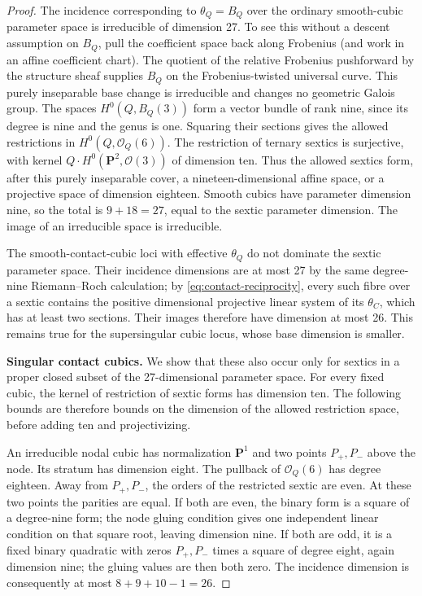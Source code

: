 \begin{proof}
The incidence corresponding to $\theta_Q=B_Q$ over the ordinary
smooth-cubic parameter space is irreducible of dimension 27.
To see this without a descent assumption on $B_Q$, pull the
coefficient space back along Frobenius (and work in an affine
coefficient chart).  The quotient of the relative Frobenius pushforward
by the structure sheaf supplies $B_Q$ on the Frobenius-twisted universal
curve.  This purely inseparable base change is irreducible and changes
no geometric Galois group.  The spaces
$H^0(Q,B_Q(3))$ form a vector bundle of rank nine, since its degree is
nine and the genus is one.  Squaring their sections gives the allowed
restrictions in $H^0(Q,\mathcal O_Q(6))$.
The restriction of ternary sextics is surjective, with kernel
$Q\cdot H^0(\mathbf P^2,\mathcal O(3))$ of dimension ten.
Thus the allowed sextics form, after this purely inseparable cover,
a nineteen-dimensional affine space, or a projective space of
dimension eighteen.  Smooth cubics have parameter dimension nine,
so the total is $9+18=27$, equal to the sextic parameter dimension.
The image of an irreducible space is irreducible.

The smooth-contact-cubic loci with effective $\theta_Q$ do not
dominate the sextic parameter space.  Their incidence dimensions are
at most 27 by the same degree-nine Riemann--Roch calculation; by
\eqref{eq:contact-reciprocity}, every such fibre over a sextic contains
the positive dimensional projective linear system of its
$\theta_C$, which has at least two sections.  Their images therefore
have dimension at most 26.  This remains true for the supersingular
cubic locus, whose base dimension is smaller.

\par\smallskip\noindent\textbf{Singular contact cubics.}
We show that these also occur only for sextics in a proper closed
subset of the 27-dimensional parameter space.
For every fixed cubic, the kernel of restriction of sextic forms has
dimension ten.  The following bounds are therefore bounds on the
dimension of the allowed restriction space, before adding ten and
projectivizing.

An irreducible nodal cubic has normalization $\mathbf P^1$ and two
points $P_+,P_-$ above the node.  Its stratum has dimension eight.
The pullback of $\mathcal O_Q(6)$ has degree eighteen.
Away from $P_+,P_-$, the orders of the restricted sextic are even.
At these two points the parities are equal.  If both are even, the
binary form is a square of a degree-nine form; the node gluing
condition gives one independent linear condition on that square root,
leaving dimension nine.  If both are odd, it is a fixed binary
quadratic with zeros $P_+,P_-$ times a square of degree eight, again
dimension nine; the gluing values are then both zero.  The incidence
dimension is consequently at most $8+9+10-1=26$.


\end{proof}
